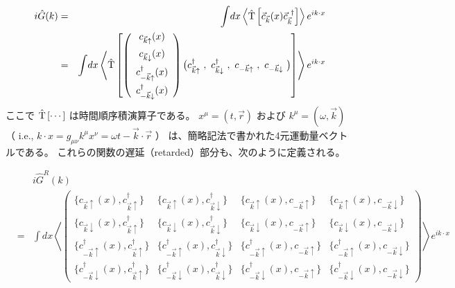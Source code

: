 \documentclass[uplatex,a4j,12pt,dvipdfmx]{jsarticle}
\begin{document}
\begin{eqnarray}
	i
	\hat{G}(k)
	&=&
	\int \! dx
	\left\langle \hat{\rm T} \left[ \vec{c}_{\vec{k}}(x) \vec{c}_{\vec{k}}^{\ \dagger} \right] \right\rangle
	e^{ i k \cdot x }
	\nonumber \\ &=&
	\int \! dx
	\left\langle \hat{\rm T} \left[
		\left(
		\begin{array}{c}
				c_{\vec{k} \uparrow}(x)            \\[2mm]
				c_{\vec{k} \downarrow}(x)          \\[2mm]
				c^{\dagger}_{-\vec{k} \uparrow}(x) \\[2mm]
				c^{\dagger}_{-\vec{k} \downarrow}(x)
			\end{array}
		\right)
		\big( c^{\dagger}_{\vec{k} \uparrow} \ , \ c^{\dagger}_{\vec{k} \downarrow} \ , \ c_{-\vec{k} \uparrow} \ , \ c_{-\vec{k} \downarrow}  \big)
		\right]
	\right\rangle
	e^{ i k \cdot x }
\end{eqnarray}
%
ここで $\hat{\rm T} \left[ \cdots \right]$ は時間順序積演算子である。
$x^{\mu}=(t,\vec{r})$ および $k^{\mu}=(\omega,\vec{k})$
（ i.e., $k \cdot x = g_{\mu \nu} k^{\mu} x^{\nu} = \omega t- \vec{k} \cdot \vec{r}$ ）
は、簡略記法で書かれた4元運動量ベクトルである。
これらの関数の遅延（retarded）部分も、次のように定義される。

\begin{eqnarray}
	&&
	i
	\hat{G}^{R}(k)
	\nonumber \\ &=&
	\int \! dx
	\left\langle
	\left(
	\begin{array}{cccc}
			\{ c_{\vec{k}\uparrow}(x), c_{\vec{k}\uparrow}^{\dagger} \}                & \{ c_{\vec{k}\uparrow}(x), c^{\dagger}_{\vec{k} \downarrow} \}               & \{ c_{\vec{k} \uparrow}(x), c_{-\vec{k} \uparrow} \}              & \{ c_{\vec{k} \uparrow}(x), c_{-\vec{k} \downarrow} \}
			\\[3mm]
			\{ c_{\vec{k} \downarrow}(x), c_{\vec{k}\uparrow}^{\dagger} \}             & \{ c_{\vec{k} \downarrow}(x), c^{\dagger}_{\vec{k} \downarrow} \}            & \{ c_{\vec{k} \downarrow}(x), c_{-\vec{k} \uparrow} \}            & \{ c_{\vec{k} \downarrow}(x), c_{-\vec{k} \downarrow} \}
			\\[3mm]
			\{ c^{\dagger}_{-\vec{k} \uparrow}(x), c^{\dagger}_{\vec{k} \uparrow} \}   & \{ c^{\dagger}_{-\vec{k} \uparrow}(x), c^{\dagger}_{\vec{k} \downarrow} \}   & \{ c^{\dagger}_{-\vec{k} \uparrow}(x), c_{-\vec{k} \uparrow} \}   & \{ c^{\dagger}_{-\vec{k} \uparrow}(x), c_{-\vec{k} \downarrow} \}
			\\[3mm]
			\{ c^{\dagger}_{-\vec{k} \downarrow}(x), c^{\dagger}_{\vec{k} \uparrow} \} & \{ c^{\dagger}_{-\vec{k} \downarrow}(x), c^{\dagger}_{\vec{k} \downarrow} \} & \{ c^{\dagger}_{-\vec{k} \downarrow}(x), c_{-\vec{k} \uparrow} \} & \{ c^{\dagger}_{-\vec{k} \downarrow}(x), c_{-\vec{k} \downarrow} \}
		\end{array}
	\right)
	\right\rangle
	e^{ i k \cdot x }
\end{eqnarray}
%
\end{document}

